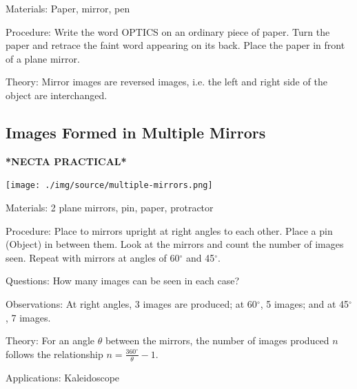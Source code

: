 \begin{multicols}{2}
\begin{description*}
\item[Materials:]{Paper, mirror, pen}
\item[Procedure:]{Write the word OPTICS on an ordinary piece of paper. Turn the paper and retrace the faint word appearing on its back. Place the paper in front of a plane mirror.}
\item[Theory:]{Mirror images are reversed images, i.e. the left and right side of the object are
interchanged.}
\end{description*}

\subsection{Images Formed in Multiple Mirrors}
\textbf{*NECTA PRACTICAL*}

\begin{center}
\texttt{[image: ./img/source/multiple-mirrors.png]}
\end{center}

\begin{description*}
\item[Materials:]{2 plane mirrors, pin, paper, protractor}
\item[Procedure:]{Place to mirrors upright at right angles to each other. Place a pin (Object) in between them. Look at the mirrors and count the number of images seen. Repeat with mirrors at angles of 60$^\circ$ and 45$^\circ$.}
\item[Questions:]{How many images can be seen in each case?}
\item[Observations:]{At right angles, 3 images are produced; at 60$^\circ$, 5 images; and at 45$^\circ$, 7 images.}
\item[Theory:]{For an angle $\theta$ between the mirrors, the number of images produced $n$ follows the relationship $n = \frac{360^\circ}{\theta} - 1$.}
\item[Applications:]{Kaleidoscope}
\end{description*}


\end{multicols}
